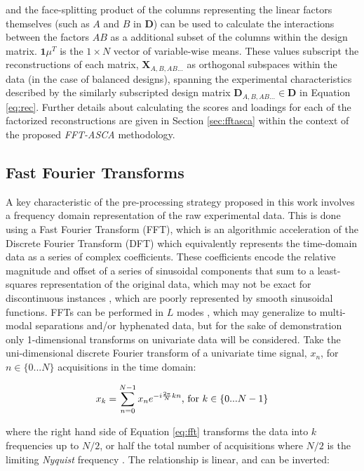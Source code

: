 \documentclass[preprint,12pt]{elsarticle}
\begin{document}
\noindent and the face-splitting product of the columns representing the linear factors themselves (such as $A$ and $B$ in $\mathbf{D}$) can be used to calculate the interactions between the factors $AB$ as a additional subset of the columns within the design matrix. $\mathbf{1}\mu^T$ is the $1\times N$ vector of variable-wise means. These values subscript the reconstructions of each matrix, $\mathbf{X}_{A,B,AB...}$ as orthogonal subspaces within the data (in the case of balanced designs), spanning the experimental characteristics described by the similarly subscripted design matrix $\mathbf{D}_{A,B,AB...} \in \mathbf{D}$ in Equation \ref{eq:rec}. Further details about calculating the scores and loadings for each of the factorized reconstructions are given in Section \ref{sec:fftasca} within the context of the proposed \textit{FFT-ASCA} methodology.

\subsection{Fast Fourier Transforms}

A key characteristic of the pre-processing strategy proposed in this work involves a frequency domain representation of the raw experimental data. This is done using a Fast Fourier Transform (FFT), which is an algorithmic acceleration of the Discrete Fourier Transform (DFT) which equivalently represents the time-domain data as a series of complex coefficients. These coefficients encode the relative magnitude and offset of a series of sinusoidal components that sum to a least-squares representation of the original data, which may not be exact for discontinuous instances \cite{nussbaumer1974gibbs}, which are poorly represented by smooth sinusoidal functions. FFTs can be performed in $L$ modes \cite{smith1995handbook}, which may generalize to multi-modal separations and/or hyphenated data, but for the sake of demonstration only 1-dimensional transforms on univariate data will be considered. Take the uni-dimensional discrete Fourier transform of a univariate time signal, $x_n$, for $n \in \{0...N\}$ acquisitions in the time domain:

\begin{equation}\label{eq:fft}
    x_k = \sum_{n=0}^{N-1} x_n e^{-i \frac{2\pi}{N} kn}\textnormal{, for } k \in \{0...N-1\}
\end{equation}

\noindent where the right hand side of Equation \ref{eq:fft} transforms the data into $k$ frequencies up to $N/2$, or half the total number of acquisitions where $N/2$ is the limiting \textit{Nyquist} frequency \cite{smith1995handbook}. The relationship is linear, and can be inverted:
\end{document}
